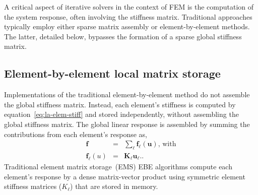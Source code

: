 \documentclass[]             %
{NASA}                       %
\begin{document}
A critical aspect of iterative solvers in the context of FEM is the computation of the system response, often involving the stiffness matrix. Traditional approaches typically employ either sparse matrix assembly or element-by-element methods. The latter, detailed below, bypasses the formation of a sparse global stiffness matrix.

\subsection{Element-by-element local matrix storage}
\label{subsec:EBE-EMS}

Implementations of the traditional element-by-element method do not assemble the global
 stiffness matrix.
 Instead, each element's stiffness is computed by equation~\ref{eq:la-elem-stiff}
and stored independently, without assembling the global stiffness matrix.
 The global linear response is assembled by summing the contributions
 from each element's response as,
\begin{eqnarray}
\label{ebe-ems-force-summation}
\mathbf{f} & = & \sum_{\ell}\mathbf{f}_{\ell}(\mathbf{u})\text{, with}\label{eq:EBE-force-assembly} \\
\mathbf{f}_{\ell}(u) & = & \mathbf{K}_{\ell}\mathbf{u}_{\ell}\text{.}\label{eq:EMS-elem-response}\text{.} \nonumber
\end{eqnarray}
Traditional element matrix storage~(EMS) EBE algorithms compute each element's
 response by a dense matrix-vector product using symmetric element stiffness
 matrices ($K_{\ell}$) that are stored in memory.
\end{document}
